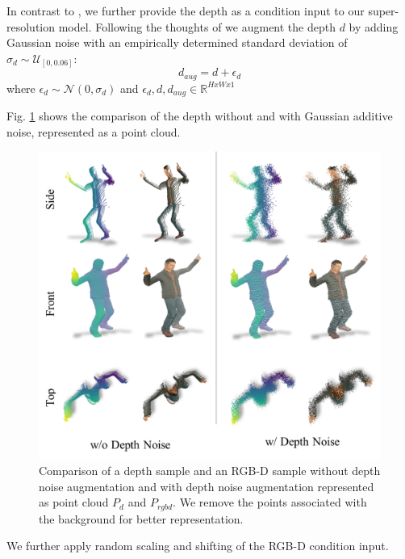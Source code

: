 In contrast to \cite{ho_cascaded_2021}, we further provide the depth as a condition input to our super-resolution model. Following the thoughts of \cite{ho_cascaded_2021} we augment the depth $d$ by adding Gaussian noise with an empirically determined standard deviation of $\sigma_{d} \sim \mathcal{U}_{[0,0.06]}$:
\begin{equation}
\label{eq:depth_aug}
    d_{aug} = d + \epsilon_{d}
\end{equation}
where $\epsilon_{d} \sim \mathcal{N}\left(0,\sigma_{d}\right)$ and $\epsilon_{d},d,d_{aug} \in \mathbb{R}^{HxWx1}$

Fig. \ref{fig:depth_gaussian_augmentation} shows the comparison of the depth without and with Gaussian additive noise, represented as a point cloud.

\begin{figure}[t]
  \centering
  \includegraphics[width=0.99\linewidth]{illustrations/depth_noise.png}
  \caption{Comparison of a depth sample and an RGB-D sample without depth noise augmentation and with depth noise augmentation represented as point cloud $P_{d}$ and $P_{rgbd}$. We remove the points associated with the background for better representation.}
  \label{fig:depth_gaussian_augmentation}
\end{figure}
We further apply random scaling and shifting of the RGB-D condition input.